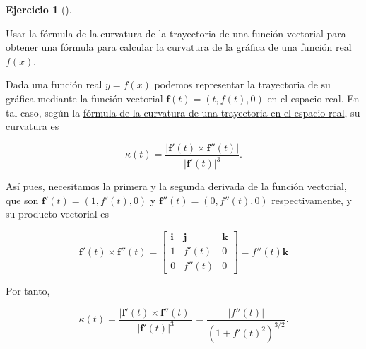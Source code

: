 \documentclass[
  spanish,
  a4paper,
]{scrreport}
\theoremstyle{definition}
\newtheorem{exercise}{Ejercicio}[chapter]
\theoremstyle{remark}
\begin{document}
\begin{exercise}[]\protect\hypertarget{exr-curvatura-funcion}{}\label{exr-curvatura-funcion}

Usar la fórmula de la curvatura de la trayectoria de una función
vectorial para obtener una fórmula para calcular la curvatura de la
gráfica de una función real \(f(x)\).

\end{exercise}

\begin{tcolorbox}[enhanced jigsaw, arc=.35mm, bottomrule=.15mm, bottomtitle=1mm, breakable, colback=white, colbacktitle=quarto-callout-tip-color!10!white, colframe=quarto-callout-tip-color-frame, coltitle=black, left=2mm, leftrule=.75mm, opacityback=0, opacitybacktitle=0.6, rightrule=.15mm, title=\textcolor{quarto-callout-tip-color}{\faLightbulb}\hspace{0.5em}{Solución}, titlerule=0mm, toprule=.15mm, toptitle=1mm]

Dada una función real \(y=f(x)\) podemos representar la trayectoria de
su gráfica mediante la función vectorial
\(\mathbf{f}(t) = (t, f(t), 0)\) en el espacio real. En tal caso, según
la
\href{https://aprendeconalf.es/analisis-manual/12-funciones-vectoriales.html\#thm-curvatura-trayectoria-espacio-real}{fórmula
de la curvatura de una trayectoria en el espacio real}, su curvatura es

\[
\kappa(t)= \frac{|\mathbf{f}'(t)\times \mathbf{f}''(t)|}{|\mathbf{f}'(t)|^3}.
\]

Así pues, necesitamos la primera y la segunda derivada de la función
vectorial, que son \(\mathbf{f}'(t)=(1,f'(t),0)\) y
\(\mathbf{f}''(t) = (0, f''(t), 0)\) respectivamente, y su producto
vectorial es

\[
\mathbf{f}'(t)\times \mathbf{f}''(t) 
= 
\begin{bmatrix}
\mathbf{i} & \mathbf{j} & \mathbf{k}\\
1 & f'(t) & 0\\
0 & f''(t) & 0 
\end{bmatrix}
= f''(t)\mathbf{k}
\]

Por tanto,

\[
\kappa(t)= \frac{|\mathbf{f}'(t)\times \mathbf{f}''(t)|}{|\mathbf{f}'(t)|^3}
= \frac{|f''(t)|}{(1+f'(t)^2)^{3/2}}.
\]

\end{tcolorbox}
\end{document}
